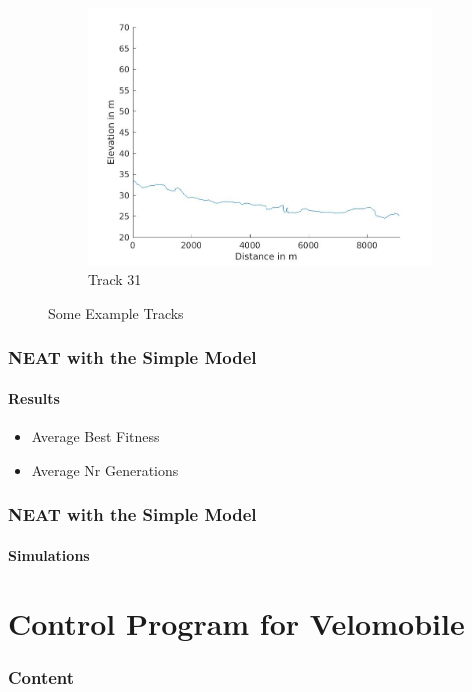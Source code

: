 \documentclass[8pt]{beamer}
\begin{document}
\begin{frame}
\begin{figure}
\begin{subfigure}[b]{0.3\textwidth}
        \label{fig:tiger}
    \end{subfigure}
    ~ %
    \begin{subfigure}[b]{0.3\textwidth}
        \includegraphics[width=\textwidth]{images/t31.jpg}
        \caption{Track 31}
        \label{fig:mouse}
    \end{subfigure}
    \caption{Some Example Tracks}\label{fig:animals}
\end{figure}
\end{frame}

\begin{frame}
	\frametitle{NEAT with the Simple Model}
	\framesubtitle{Results}
	\begin{itemize}
		\item Average Best Fitness
		\item Average Nr Generations
	\end{itemize}
\end{frame}

\begin{frame}
	\frametitle{NEAT with the Simple Model}
	\framesubtitle{Simulations}
\end{frame}


\section{Control Program for Velomobile}
\begin{frame}
	\frametitle{Content}
\end{frame}
\end{document}

